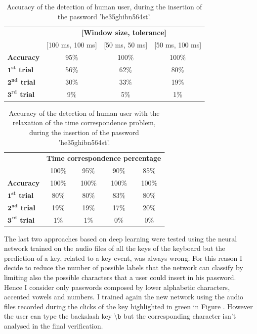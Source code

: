 \begin{table}[H]
\centering\footnotesize
\begin{tabular}{lccc}
\cline{2-4}
&\multicolumn{3}{c}{\textbf{[Window size, tolerance]}}\\
\cline{2-4}
&{[100 ms, 100 ms]}&{[50 ms, 50 ms]}&{[50 ms, 100 ms]}\\
\hline
{\textbf{Accuracy}}&{95\%}&{100\%}&{100\%}\\
\hline
{\textbf{$\mathbf{1^{st}}$ trial}}&{56\%}&{62\%}&{80\%}\\
\hline
{\textbf{$\mathbf{2^{nd}}$ trial}}&{30\%}&{33\%}&{19\%}\\
\hline
{\textbf{$\mathbf{3^{rd}}$ trial}}&{9\%}&{5\%}&{1\%}\\
\hline
\end{tabular}
\caption{\footnotesize{Accuracy of the detection of human user, during the insertion of the password 'he35ghibn564st'.}}
\label{Results:he35ghibn564st}
\end{table}
\begin{table}[H]
\centering\footnotesize
\begin{tabular}{lcccc}
\cline{2-5}
&\multicolumn{4}{c}{\textbf{Time correspondence percentage}}\\
\cline{2-5}
&{100\%}&{95\%}&{90\%}&{85\%}\\
\hline
{\textbf{Accuracy}}&{100\%}&{100\%}&{100\%}&{100\%}\\
\hline
{\textbf{$\mathbf{1^{st}}$ trial}}&{80\%}&{80\%}&{83\%}&{80\%}\\
\hline
{\textbf{$\mathbf{2^{nd}}$ trial}}&{19\%}&{19\%}&{17\%}&{20\%}\\
\hline
{\textbf{$\mathbf{3^{rd}}$ trial}}&{1\%}&{1\%}&{0\%}&{0\%}\\
\hline
\end{tabular}
\caption{\footnotesize{Accuracy of the detection of human user with the relaxation of the time correspondence problem, during the insertion of the password 'he35ghibn564st'.}}
\label{Results:relaxation_time}
\end{table}
The last two approaches based on deep learning were tested using the neural network trained on the audio files of all the keys of the keyboard but the prediction of a key, related to a key event, was always wrong. For this reason I decide to reduce the number of possible labels that the network can classify by limiting also the possible characters that a user could insert in his password.\\
Hence I consider only passwords composed by lower alphabetic characters, accented vowels and numbers. I trained again the new network using the audio files recorded during the clicks of the key highlighted in green in Figure . However the user can type the backslash key $\mathtt{\setminus b}$ but the corresponding character isn't analysed in the final verification.\\
